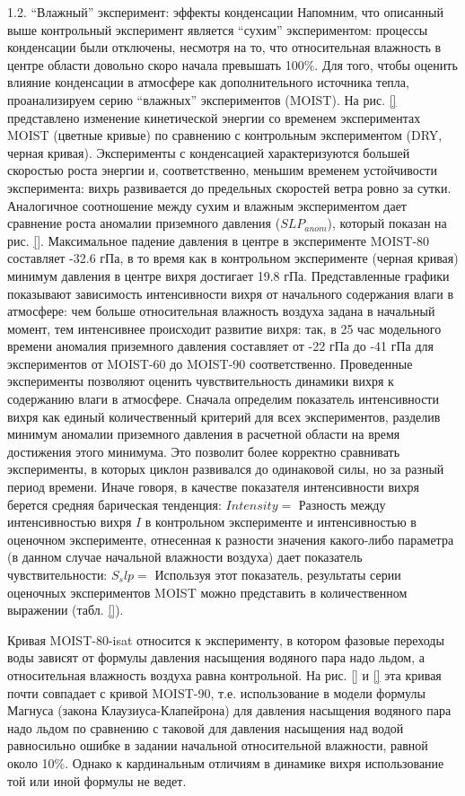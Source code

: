 1.2.	 “Влажный” эксперимент: эффекты конденсации
Напомним, что описанный выше контрольный эксперимент является “сухим” экспериментом: процессы конденсации были отключены, несмотря на то, что относительная влажность в центре области довольно скоро начала превышать 100\%. Для того, чтобы оценить влияние конденсации в атмосфере как дополнительного источника тепла, проанализируем серию “влажных” экспериментов (MOIST). На рис. \ref{} представлено изменение кинетической энергии со временем экспериментах MOIST (цветные кривые) по сравнению с контрольным экспериментом (DRY, черная кривая). Эксперименты с конденсацией характеризуются большей скоростью роста энергии и, соответственно, меньшим временем устойчивости эксперимента: вихрь развивается до предельных скоростей ветра ровно за сутки. 
Аналогичное соотношение между сухим и влажным экспериментом дает сравнение роста аномалии приземного давления ($SLP_{anom}$), который показан на рис. \ref{}. Максимальное падение давления в центре в эксперименте MOIST-80 составляет -32.6 гПа, в то время как в контрольном эксперименте (черная кривая) минимум давления в центре вихря достигает 19.8 гПа.
Представленные графики показывают зависимость интенсивности вихря от начального содержания влаги в атмосфере: чем больше относительная влажность воздуха задана в начальный момент, тем интенсивнее происходит развитие вихря: так, в  25 час модельного времени аномалия приземного давления составляет от -22 гПа до -41 гПа для экспериментов от MOIST-60 до MOIST-90 соответственно.
Проведенные эксперименты позволяют оценить чувствительность динамики вихря к содержанию влаги в атмосфере. Сначала определим показатель интенсивности вихря как единый количественный критерий для всех экспериментов, разделив минимум аномалии приземного давления в расчетной области на время достижения этого минимума. Это позволит более корректно сравнивать эксперименты, в которых циклон развивался до одинаковой силы, но за разный период времени. Иначе говоря, в качестве показателя интенсивности вихря берется средняя барическая тенденция:
$Intensity=$
Разность между интенсивностью вихря $I$ в контрольном эксперименте и интенсивностью в оценочном эксперименте, отнесенная к разности значения какого-либо параметра (в данном случае начальной влажности воздуха) дает показатель чувствительности:
$S_slp=$
Используя этот показатель, результаты серии оценочных экспериментов MOIST можно представить в количественном выражении (табл. \ref{}).
\begin{table}
\end{table}
Кривая MOIST-80-isat относится к эксперименту, в котором фазовые переходы воды зависят от формулы давления насыщения водяного пара надо льдом, а относительная влажность воздуха равна контрольной. На рис. \ref{} и \ref{} эта кривая почти совпадает с кривой MOIST-90, т.е. использование в модели формулы Магнуса (закона Клаузиуса-Клапейрона) для давления насыщения водяного пара надо льдом по сравнению с таковой для давления насыщения над водой равносильно ошибке в задании начальной относительной влажности, равной около 10\%. Однако к кардинальным отличиям в динамике вихря использование той или иной формулы не ведет.

